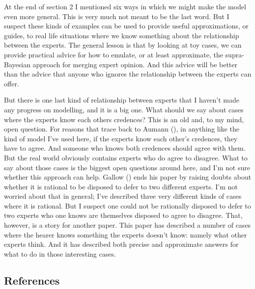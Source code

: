 \documentclass[
  10pt,
  letterpaper,
  DIV=11,
  numbers=noendperiod,
  twoside]{scrartcl}
\begin{document}
At the end of section 2 I mentioned six ways in which we might make the
model even more general. This is very much not meant to be the last
word. But I suspect these kinds of examples can be used to provide
useful approximations, or guides, to real life situations where we know
something about the relationship between the experts. The general lesson
is that by looking at toy cases, we can provide practical advice for how
to emulate, or at least approximate, the supra-Bayesian approach for
merging expert opinion. And this advice will be better than the advice
that anyone who ignores the relationship between the experts can offer.

But there is one last kind of relationship between experts that I
haven't made any progress on modelling, and it is a big one. What should
we say about cases where the experts know each others credences? This is
an old and, to my mind, open question. For reasons that trace back to
Aumann (), in anything like the kind of
model I've used here, if the experts know each other's credences, they
have to agree. And someone who knows both credences should agree with
them. But the real world obviously contains experts who do agree to
disagree. What to say about those cases is the biggest open questions
around here, and I'm not sure whether this approach can help. Gallow
() ends his paper by raising doubts about
whether it is rational to be disposed to defer to two different experts.
I'm not worried about that in general; I've described three very
different kinds of cases where it is rational. But I suspect one could
not be rationally disposed to defer to two experts who one knows are
themselves disposed to agree to disagree. That, however, is a story for
another paper. This paper has described a number of cases where the
hearer knows something the experts doesn't know: namely what other
experts think. And it has described both precise and approximate answers
for what to do in those interesting cases.

\subsection*{References}\label{references}
\end{document}
